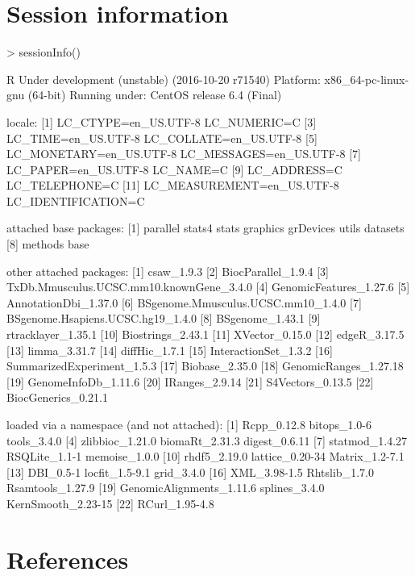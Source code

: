\documentclass[12pt]{report}
\renewenvironment{Schunk}{\vspace{0pt}}{\vspace{0pt}}
\begin{document}
\section{Session information}
\begin{Schunk}
\begin{Sinput}
> sessionInfo()
\end{Sinput}
\begin{Soutput}
R Under development (unstable) (2016-10-20 r71540)
Platform: x86_64-pc-linux-gnu (64-bit)
Running under: CentOS release 6.4 (Final)

locale:
 [1] LC_CTYPE=en_US.UTF-8       LC_NUMERIC=C              
 [3] LC_TIME=en_US.UTF-8        LC_COLLATE=en_US.UTF-8    
 [5] LC_MONETARY=en_US.UTF-8    LC_MESSAGES=en_US.UTF-8   
 [7] LC_PAPER=en_US.UTF-8       LC_NAME=C                 
 [9] LC_ADDRESS=C               LC_TELEPHONE=C            
[11] LC_MEASUREMENT=en_US.UTF-8 LC_IDENTIFICATION=C       

attached base packages:
[1] parallel  stats4    stats     graphics  grDevices utils     datasets 
[8] methods   base     

other attached packages:
 [1] csaw_1.9.3                              
 [2] BiocParallel_1.9.4                      
 [3] TxDb.Mmusculus.UCSC.mm10.knownGene_3.4.0
 [4] GenomicFeatures_1.27.6                  
 [5] AnnotationDbi_1.37.0                    
 [6] BSgenome.Mmusculus.UCSC.mm10_1.4.0      
 [7] BSgenome.Hsapiens.UCSC.hg19_1.4.0       
 [8] BSgenome_1.43.1                         
 [9] rtracklayer_1.35.1                      
[10] Biostrings_2.43.1                       
[11] XVector_0.15.0                          
[12] edgeR_3.17.5                            
[13] limma_3.31.7                            
[14] diffHic_1.7.1                           
[15] InteractionSet_1.3.2                    
[16] SummarizedExperiment_1.5.3              
[17] Biobase_2.35.0                          
[18] GenomicRanges_1.27.18                   
[19] GenomeInfoDb_1.11.6                     
[20] IRanges_2.9.14                          
[21] S4Vectors_0.13.5                        
[22] BiocGenerics_0.21.1                     

loaded via a namespace (and not attached):
 [1] Rcpp_0.12.8              bitops_1.0-6             tools_3.4.0             
 [4] zlibbioc_1.21.0          biomaRt_2.31.3           digest_0.6.11           
 [7] statmod_1.4.27           RSQLite_1.1-1            memoise_1.0.0           
[10] rhdf5_2.19.0             lattice_0.20-34          Matrix_1.2-7.1          
[13] DBI_0.5-1                locfit_1.5-9.1           grid_3.4.0              
[16] XML_3.98-1.5             Rhtslib_1.7.0            Rsamtools_1.27.9        
[19] GenomicAlignments_1.11.6 splines_3.4.0            KernSmooth_2.23-15      
[22] RCurl_1.95-4.8          
\end{Soutput}
\end{Schunk}

\section{References}


\end{document}
